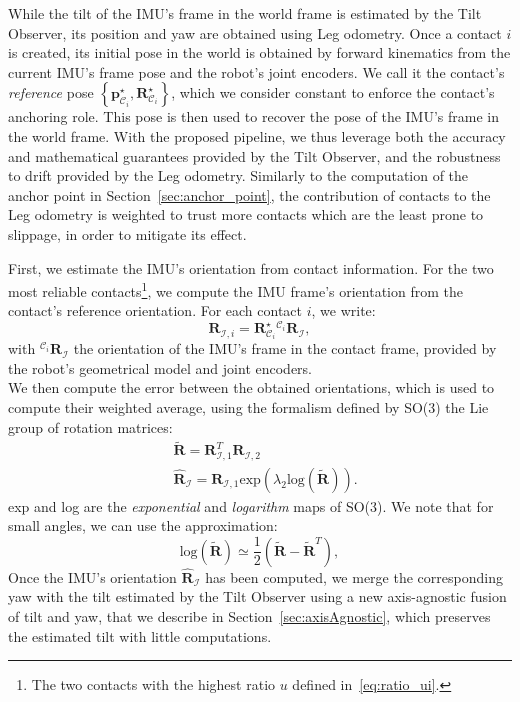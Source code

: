 \documentclass{IJCAS}
\begin{document}
While the tilt of the IMU's frame in the world frame is estimated by the Tilt Observer, its position and yaw are obtained using Leg odometry. Once a contact $i$ is created, its initial pose in the world is obtained by forward kinematics from the current IMU's frame pose and the robot's joint encoders. We call it the contact's \emph{reference} pose $\left\{ \boldsymbol{p}^{\star}_{\mathcal{C}_{i}}, \boldsymbol{R}^{\star}_{\mathcal{C}_{i}}\right\}$, which we consider constant to enforce the contact's anchoring role. This pose is then used to recover the pose of the IMU's frame in the world frame. 
With the proposed pipeline, we thus leverage both the accuracy and mathematical guarantees provided by the Tilt Observer, and the robustness to drift provided by the Leg odometry. Similarly to the computation of the anchor point in Section~\ref{sec:anchor_point}, the contribution of contacts to the Leg odometry is weighted to trust more contacts which are the least prone to slippage, in order to mitigate its effect.

First, we estimate the IMU's orientation from contact information. For the two most reliable contacts\footnote{The two contacts with the highest ratio $u$ defined in~\eqref{eq:ratio_ui}.}, we compute the IMU frame's orientation from the contact's reference orientation. For each contact $i$, we write:
\begin{equation}
    \boldsymbol{R}_{\mathcal{I}, i} = \boldsymbol{R}^{\star}_{\mathcal{C}_{i}} {}^{\mathcal{C}_{i}} \boldsymbol{R}_{\mathcal{I}},
\end{equation}
with ${}^{\mathcal{C}_{i}} \boldsymbol{R}_{\mathcal{I}}$ the orientation of the IMU's frame in the contact frame, provided by the robot's geometrical model and joint encoders.\\
We then compute the error between the obtained orientations, which is used to compute their weighted average, using the formalism defined by SO(3) the Lie group of rotation matrices:
\begin{align}
    &\tilde{\boldsymbol{R}} = \boldsymbol{R}^{T}_{\mathcal{I}, 1} \boldsymbol{R}_{\mathcal{I}, 2}  \\
 & \hat{\boldsymbol{R}}_{\mathcal{I}} = \boldsymbol{R}_{\mathcal{I}, 1} \text{exp} \left( \lambda_{2}\text{log} \left( \tilde{\boldsymbol{R}}\right)  \right). \label{eq:leg_odom_avg_ori}
\end{align}
exp and log are the \emph{exponential} and \emph{logarithm} maps of SO(3). We note that for small angles, we can use the approximation:
\begin{equation}
\text{log}\left(\tilde{\boldsymbol{R}}\right) \simeq \frac{1}{2} \left(\tilde{\boldsymbol{R}}-\tilde{\boldsymbol{R}}^{T}\right), \label{eq:log_small}
\end{equation}
Once the IMU's orientation $\hat{\boldsymbol{R}}_{\mathcal{I}}$ has been computed, we merge the corresponding yaw with the tilt estimated by the Tilt Observer using a new axis-agnostic fusion of tilt and yaw, that we describe in Section~\ref{sec:axisAgnostic}, which preserves the estimated tilt with little computations.
\end{document}
